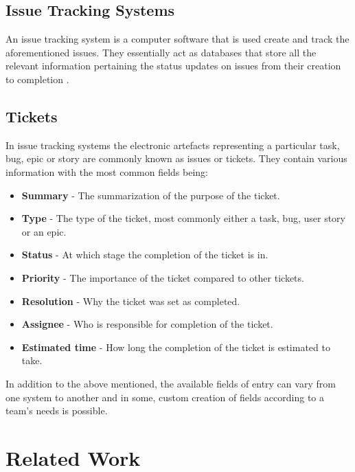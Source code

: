 \documentclass{4thYearProject}
\begin{document}
\subsection{Issue Tracking Systems}

An issue tracking system is a computer software that is used create and track the aforementioned issues. They essentially act as databases that store all the relevant information pertaining the status updates on issues from their creation to completion \cite{socialnature}. %

\subsection{Tickets}

In issue tracking systems the electronic artefacts representing a particular task, bug, epic or story are commonly known as issues or tickets. They contain various information with the most common fields being:

\begin{itemize}
\item \textbf{Summary} - The summarization of the purpose of the ticket.
\item \textbf{Type} - The type of the ticket, most commonly either a task, bug, user story or an epic. 
\item \textbf{Status} - At which stage the completion of the ticket is in.
\item \textbf{Priority} - The importance of the ticket compared to other tickets.
\item \textbf{Resolution} - Why the ticket was set as completed.
\item \textbf{Assignee} - Who is responsible for completion of the ticket.
\item \textbf{Estimated time} - How long the completion of the ticket is estimated to take.
\end{itemize}

In addition to the above mentioned, the available fields of entry can vary from one system to another and in some, custom creation of fields according to a team's needs is possible. 

\section{Related Work}
\end{document}
